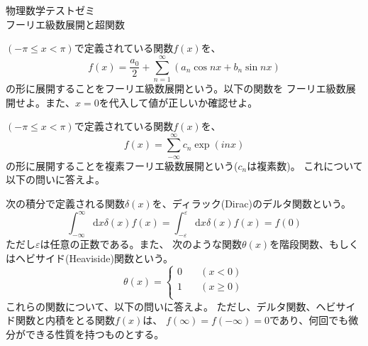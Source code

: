 \documentclass{jarticle}
\newcommand{\diff}{\mathrm d}
\begin{document}


\newpage

\begin{center}
{\huge 物理数学テストゼミ}\\[3mm]
{\Large フーリエ級数展開と超関数}
\end{center}

\question
$(-\pi \le x < \pi)$で定義されている関数$f(x)$を、
$$
f(x) = \frac{a_0}{2} + \sum_{n=1}^\infty (a_n \cos nx + b_n \sin nx)
$$
の形に展開することをフーリエ級数展開という。以下の関数を
フーリエ級数展開せよ。また、$x=0$を代入して値が正しいか確認せよ。



\question
$(-\pi \le x < \pi)$で定義されている関数$f(x)$を、
$$
f(x) = \sum_{-\infty}^{\infty} c_n \exp{(inx)}
$$
の形に展開することを複素フーリエ級数展開という($c_n$は複素数)。
これについて以下の問いに答えよ。



\question 
次の積分で定義される関数$\delta(x)$を、ディラック(Dirac)のデルタ関数という。
$$
\int_{-\infty}^{\infty} \!\!\! \diff x \delta(x) f(x) =
\int_{-\varepsilon}^{\varepsilon} \!\!\! \diff x \delta(x) f(x) = 
f(0)
$$
ただし$\varepsilon$は任意の正数である。また、
次のような関数$\theta(x)$を階段関数、もしくはヘビサイド(Heaviside)関数という。
$$
\theta(x) = 
\left\{
\begin{array}{cc}
0 & \quad (x < 0) \\
1 & \quad (x \ge 0) \\
\end{array}
\right.
$$
これらの関数について、以下の問いに答えよ。
ただし、デルタ関数、ヘビサイド関数と内積をとる関数$f(x)$は、
$f(\infty) = f(-\infty) = 0$であり、何回でも微分ができる性質を持つものとする。
\end{document}
